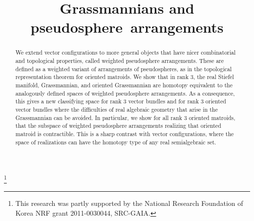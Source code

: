 \documentclass[JEP,XML,SOM,Unicode,NoFloatCountersInSection,published]{cedram}
\theoremstyle{remark}
\begin{document}
\frontmatter
\title{Grassmannians and pseudosphere~arrangements}

\author[\initial{M. G.} \lastname{Dobbins}]{  }
\address{Department of Mathematical Sciences, Binghamton University (SUNY)\\
Binghamton, New York, USA}

\thanks{This research was partly supported by the National Research Foundation of Korea NRF grant 2011-0030044, SRC-GAIA.}

\begin{abstract}
We extend vector configurations to more general objects that have nicer combinatorial and topological properties, called weighted pseudosphere arrangements. These are defined as a weighted variant of arrangements of pseudospheres, as in the topological representation theorem for oriented matroids. We show that in rank $3$, the real Stiefel manifold, Grassmannian, and oriented Grassmannian are homotopy equivalent to the analogously defined spaces of weighted pseudosphere arrangements. As a consequence, this gives a new classifying space for rank $3$ vector bundles and for rank $3$ oriented vector bundles where the difficulties of real algebraic geometry that arise in the Grassmannian can be avoided. In particular, we show for all rank $3$ oriented matroids, that the subspace of weighted pseudosphere arrangements realizing that oriented matroid is contractible. This is a sharp contrast with vector configurations, where the space of realizations can have the homotopy type of any real semialgebraic set.
\end{abstract}




\end{document}
